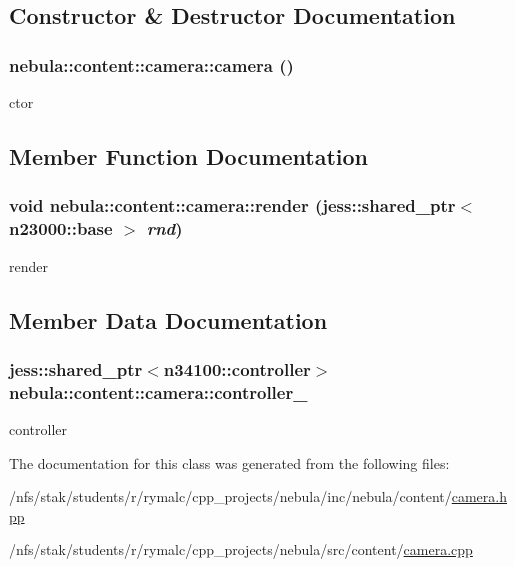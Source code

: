 \subsection{Constructor \& Destructor Documentation}
\hypertarget{classnebula_1_1content_1_1camera_a705aba1518297cf1c803fa1ab2a78219}{
\subsubsection[{camera}]{\setlength{\rightskip}{0pt plus 5cm}nebula::content::camera::camera ()}}
\label{classnebula_1_1content_1_1camera_a705aba1518297cf1c803fa1ab2a78219}


ctor 

\subsection{Member Function Documentation}
\hypertarget{classnebula_1_1content_1_1camera_a67fd3f3eec8f947473a30f0f326abd29}{
\subsubsection[{render}]{\setlength{\rightskip}{0pt plus 5cm}void nebula::content::camera::render (jess::shared\_\-ptr$<$ {\bf n23000::base} $>$ {\em rnd})}}
\label{classnebula_1_1content_1_1camera_a67fd3f3eec8f947473a30f0f326abd29}


render 

\subsection{Member Data Documentation}
\hypertarget{classnebula_1_1content_1_1camera_a66fe5754208de03005b7b06e83f6e6a0}{
\subsubsection[{controller\_\-}]{\setlength{\rightskip}{0pt plus 5cm}jess::shared\_\-ptr$<${\bf n34100::controller}$>$ {\bf nebula::content::camera::controller\_\-}}}
\label{classnebula_1_1content_1_1camera_a66fe5754208de03005b7b06e83f6e6a0}


controller 

The documentation for this class was generated from the following files:\begin{DoxyCompactItemize}
\item 
/nfs/stak/students/r/rymalc/cpp\_\-projects/nebula/inc/nebula/content/\hyperlink{camera_8hpp}{camera.hpp}\item 
/nfs/stak/students/r/rymalc/cpp\_\-projects/nebula/src/content/\hyperlink{camera_8cpp}{camera.cpp}\end{DoxyCompactItemize}
